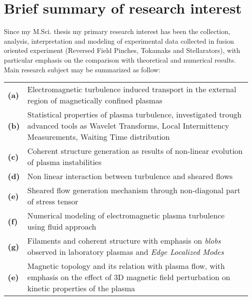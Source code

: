 \section{Brief summary of research interest}
Since my M.Sci. thesis my primary research interest has been the
collection, analysis, interpretation and modeling of experimental data
collected in fusion oriented experiment (Reversed Field Pinches,
Tokamaks and Stellarators), with particular emphasis on the comparison
with theoretical and numerical results. Main research subject may be summarized as follow: 

\begin{longtable}{>{\bfseries}l p{17cm}}
(a) & Electromagnetic turbulence induced transport in the
  external region of magnetically confined plasmas \\
(b) & Statistical properties of plasma turbulence, investigated
  trough advanced tools as Wavelet Transforms, Local Intermittency
  Measurements, Waiting Time distribution \\
(c) & Coherent structure generation as results of non-linear
  evolution of plasma instabilities \\
(d) & Non linear interaction between turbulence and sheared flows \\
(e) & Sheared flow generation mechanism through non-diagonal part
  of stress tensor \\
(f) & Numerical modeling of electromagnetic plasma turbulence
  using fluid approach \\
(g) & Filaments and coherent structure with emphasis on
  \emph{blobs} observed in laboratory plasmas and \emph{Edge Localized
  Modes} \\
(e) & Magnetic topology and its relation with plasma flow, with
emphasis on the effect of 3D magnetic field perturbation on kinetic
properties of the plasma \\
\end{longtable}

